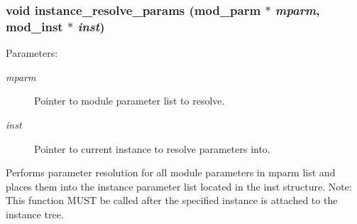\subsubsection{\setlength{\rightskip}{0pt plus 5cm}void instance\_\-resolve\_\-params ({\bf mod\_\-parm} $\ast$ {\em mparm}, {\bf mod\_\-inst} $\ast$ {\em inst})}\label{instance_8c_a5}


\begin{Desc}
\item[Parameters:]
\begin{description}
\item[{\em mparm}]Pointer to module parameter list to resolve. \item[{\em inst}]Pointer to current instance to resolve parameters into.\end{description}
\end{Desc}
Performs parameter resolution for all module parameters in mparm list and places them into the instance parameter list located in the inst structure. Note: This function MUST be called after the specified instance is attached to the instance tree. 